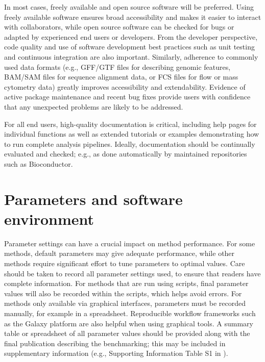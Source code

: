 \documentclass[12pt, a4paper]{article}
\begin{document}
In most cases, freely available and open source software will be preferred. Using freely available software ensures broad accessibility and makes it easier to interact with collaborators, while open source software can be checked for bugs or adapted by experienced end users or developers. From the developer perspective, code quality and use of software development best practices such as unit testing and continuous integration are also important. Similarly, adherence to commonly used data formats (e.g., GFF/GTF files for describing genomic features, BAM/SAM files for sequence alignment data, or FCS files for flow or mass cytometry data) greatly improves accessibility and extendability. Evidence of active package maintenance and recent bug fixes provide users with confidence that any unexpected problems are likely to be addressed.

For all end users, high-quality documentation is critical, including help pages for individual functions as well as extended tutorials or examples demonstrating how to run complete analysis pipelines. Ideally, documentation should be continually evaluated and checked; e.g., as done automatically by maintained repositories such as Bioconductor.




\section*{Parameters and software environment}

Parameter settings can have a crucial impact on method performance. For some methods, default parameters may give adequate performance, while other methods require significant effort to tune parameters to optimal values. Care should be taken to record all parameter settings used, to ensure that readers have complete information. For methods that are run using scripts, final parameter values will also be recorded within the scripts, which helps avoid errors. For methods only available via graphical interfaces, parameters must be recorded manually, for example in a spreadsheet. Reproducible workflow frameworks such as the Galaxy platform \citep{Afgan2018} are also helpful when using graphical tools. A summary table or spreadsheet of all parameter values should be provided along with the final publication describing the benchmarking; this may be included in supplementary information (e.g., Supporting Information Table S1 in \citep{Weber2016}).
\end{document}
